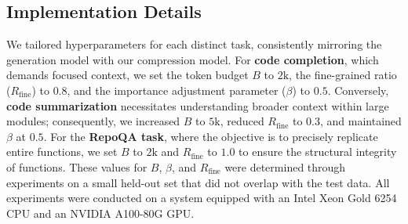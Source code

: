 \documentclass[10pt,conference]{IEEEtran}
\newcommand{\todo}[1]{{\textcolor{cyan}{\textbf{[TODO: #1]}}}}
\newcommand{\todoc}[2]{{\textcolor{#1}{\textbf{[#2]}}}}
\newcommand{\shi}[1]{\todoc{orange}{Shi: #1}}
\newcommand{\qian}[1]{\todoc{violet}{Qian: #1}}
\begin{document}
\subsection{Implementation Details}
We tailored hyperparameters for each distinct task, consistently mirroring the generation model with our compression model. For \textbf{code completion}, which demands focused context, we set the token budget $B$ to $2 \text{k}$, the fine-grained ratio ($R_{\text{fine}}$) to $0.8$, and the importance adjustment parameter ($\beta$) to $0.5$. Conversely, \textbf{code summarization} necessitates understanding broader context within large modules; consequently, we increased $B$ to $5 \text{k}$, reduced $R_{\text{fine}}$ to $0.3$, and maintained $\beta$ at $0.5$. For the \textbf{RepoQA task}, where the objective is to precisely replicate entire functions, we set $B$ to $2 \text{k}$ and $R_{\text{fine}}$ to $1.0$ to ensure the structural integrity of functions. These values for $B$, $\beta$, and $R_{\text{fine}}$ were determined through experiments on a small held-out set that did not overlap with the test data. All experiments were conducted on a system equipped with an Intel Xeon Gold 6254 CPU and an NVIDIA A100-80G GPU.

\end{document}
